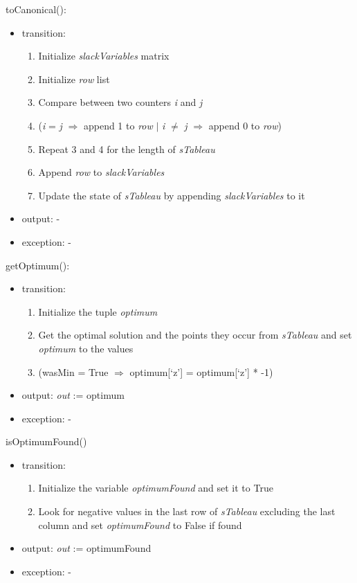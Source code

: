 \documentclass[12pt, titlepage]{article}
\begin{document}
\noindent
toCanonical():
\begin{itemize}
	\item transition:
	\begin{enumerate}
		\item Initialize \textit{slackVariables} matrix
		\item Initialize \textit{row} list
		\item Compare between two counters \textit{i} and \textit{j}
		\item (\textit{i} = \textit{j} $\Rightarrow$ append 1 to \textit{row} 
		$|$ \textit{i} $\neq$ \textit{j} $\Rightarrow$ append 0 to \textit{row})
		\item Repeat 3 and 4 for the length of \textit{sTableau}
		\item Append \textit{row} to \textit{slackVariables}
		\item Update the state of \textit{sTableau} by appending 
		\textit{slackVariables} to it
	\end{enumerate}
	\item output: -
	\item exception: -
\end{itemize}

\noindent
getOptimum():
\begin{itemize}
	\item transition: 
	\begin{enumerate}
		\item Initialize the tuple \textit{optimum}
		\item Get the optimal solution and the points they occur from 
		\textit{sTableau} and set \textit{optimum} to the values
		\item (wasMin = True $\Rightarrow$ optimum[`z'] = optimum[`z'] * -1)	
	\end{enumerate}
	\item output: \textit{out} := optimum
	\item exception: -
\end{itemize}

\noindent
isOptimumFound()
\begin{itemize}
	\item transition:
	\begin{enumerate}
		\item Initialize the variable \textit{optimumFound} and set it to True
		\item Look for negative values in the last row of  \textit{sTableau} 
		excluding the last column and set \textit{optimumFound} to False if 
		found
	\end{enumerate}
	\item output: \textit{out} := optimumFound 
	\item exception: -
\end{itemize}
\end{document}
